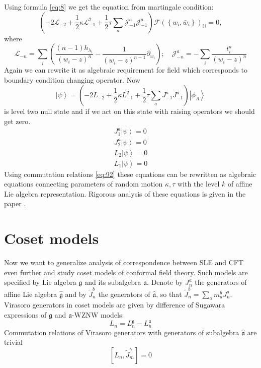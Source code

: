 \documentclass[a4paper]{jpconf}
\theoremstyle{definition}
\newcommand{\gf}{\mathfrak{g}}
\newcommand{\af}{\mathfrak{a}}
\newcommand{\gfh}{\hat{\mathfrak{g}}}
\newcommand{\afh}{\hat{\mathfrak{a}}}
\theoremstyle{definition} \newtheorem{Def}{Definition}
\begin{document}
Using formula \eqref{eq:8} we get the equation from martingale condition:
\begin{equation*}
  \left(-2 \mathcal{L}_{-2}+\frac{1}{2}\kappa \mathcal{L}_{-1}^{2}+\frac{1}{2}\tau\sum_{a} \mathcal{J}^{a}_{-1} \mathcal{J}^{a}_{-1}\right)        \mathcal{F}(\left\{w_{i}, \bar w_{i}\right\})_{\mathbb{H}}=0,
\end{equation*}
where
\begin{equation*}
  \mathcal{L}_{-n}=\sum_{i}\left(\frac{(n-1)h_{\lambda_{i}}}{(w_{i}-z)^{n}}-\frac{1}{(w_{i}-z)^{n-1}}\partial_{w_{i}}\right);\quad \mathcal{J}^{a}_{{-n}}=-\sum_{i}\frac{t^{a}_{i}}{(w_{i}-z)^{n}}
\end{equation*}
Again we can rewrite it as algebraic requirement for  field  which corresponds to boundary condition changing operator. Now
\begin{equation*}
  \left| \psi\right>=\left(-2 L_{-2}+\frac{1}{2}\kappa L_{-1}^{2}+\frac{1}{2}\tau\sum_{a} J^{a}_{-1} J^{a}_{-1}\right) \left|\phi_{\Lambda}\right>    
\end{equation*}
is level two null state and if we act on this state with raising operators we should get zero.
\begin{eqnarray}
  J^{a}_{1} \left|\psi\right>=0\\
  J^{a}_{2}\left|\psi\right>=0\\
  L_{2}\left|\psi\right>=0\\
  L_{1}\left|\psi\right>=0
\end{eqnarray}
Using commutation relations \eqref{eq:92} these equations can be rewritten as algebraic equations connecting parameters of random motion $\kappa, \tau$ with the level $k$ of affine Lie algebra representation. Rigorous analysis of these equations is given in the paper \cite{alekseev2010sle}.

\section{Coset models}
\label{sec:coset-models}
Now we want to generalize analysis of correspondence between SLE and CFT even further and study coset models of conformal field theory\cite{Goddard198588}. Such models are specified by  Lie algebra $\gf$ and its subalgebra $\af$. Denote by $J_{n}^{a}$ the generators of affine Lie algebra $\gfh$ and by $\tilde{J}_{n}^{b}$ the generators of $\afh$, so that $\tilde{J}^{b}_{n}=\sum_{a} m_{a}^{b} J^{a}_{n}$.
Virasoro generators in coset models are given by difference of Sugawara expressions of $\gf$ and $\af$-WZNW models:
\begin{equation*}
  L_{n}=L_{n}^{\gf}-L_{n}^{\af}
\end{equation*}
Commutation relations of Virasoro generators with generators of subalgebra $\afh$ are trivial
\begin{equation}
  \label{eq:26}
  \left[L_{n},\tilde{J}^{b}_{m}\right]=0
\end{equation}
\end{document}
